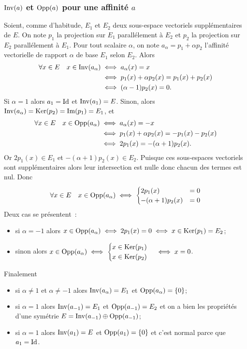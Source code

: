 \subsubsection{\(\operatorname{Inv}(a)\) et \(\operatorname{Opp}(a)\) pour une affinité \(a\)}

Soient, comme d'habitude, \(E_1\) et \(E_2\) deux sous-espace vectoriels supplémentaires de \(E\). On note \(p_1\) la projection sur \(E_1\) parallélement à \(E_2\) et \(p_2\) la projection sur \(E_2\) parallélement à \(E_1\). Pour tout scalaire \(\alpha\), on note \(a_\alpha = p_1+\alpha p_2\) l'affinité vectorielle de rapport \(\alpha\) de base \(E_1\) selon \(E_2\). Alors
\begin{align}
  \forall x \in E \quad x \in \operatorname{Inv}(a_\alpha) &\iff a_\alpha(x)=x \\
  &\iff p_1(x)+\alpha p_2(x) = p_1(x)+p_2(x) \\
  &\iff (\alpha-1) p_2(x)=0.
\end{align}
Si \(\alpha=1\) alors \(a_1=\operatorname{Id}\) et \(\operatorname{Inv}(a_1)=E\). Sinon, alors \(\operatorname{Inv}(a_\alpha)=\operatorname{Ker}(p_2)=\operatorname{Im}(p_1)=E_1\), et
\begin{align}
  \forall x \in E \quad x \in \operatorname{Opp}(a_\alpha) &\iff a_\alpha(x)=-x \\
  &\iff p_1(x)+\alpha p_2(x) = -p_1(x)-p_2(x) \\
  &\iff 2p_1(x)=-(\alpha+1)p_2(x).
\end{align}
Or \(2p_1(x) \in E_1\) et \(-(\alpha+1)p_2(x) \in E_2\). Puisque ces sous-espaces vectoriels sont supplémentaires alors leur intersection est nulle donc chacun des termes est nul. Donc
\begin{equation}
  \forall x \in E \quad x \in \operatorname{Opp}(a_\alpha) \iff \begin{cases} 2p_1(x) &=0 \\-(\alpha+1)p_2(x)&=0 \end{cases}
\end{equation}
Deux cas se présentent~:
\begin{itemize}
\item si \(\alpha=-1\) alors \(x \in \operatorname{Opp}(a_\alpha) \iff 2p_1(x)=0 \iff x \in \operatorname{Ker}(p_1)=E_2\);
\item sinon alors \(x \in \operatorname{Opp}(a_\alpha) \iff \begin{cases} x \in \operatorname{Ker}(p_1) \\ x \in \operatorname{Ker}(p_2) \end{cases} \iff x=0\).
\end{itemize}
Finalement
\begin{itemize}
\item si \(\alpha \neq 1\) et \(\alpha \neq -1\) alors \(\operatorname{Inv}(a_\alpha)=E_1\) et \(\operatorname{Opp}(a_\alpha)=\{0\}\);
\item si \(\alpha =1\) alors \(\operatorname{Inv}(a_{-1})=E_1\) et \(\operatorname{Opp}(a_{-1})=E_2\) et on a bien les propriétés d'une symétrie \(E=\operatorname{Inv}(a_{-1}) \oplus \operatorname{Opp}(a_{-1})\);
\item si \(\alpha=1\) alors  \(\operatorname{Inv}(a_{1})=E\) et \(\operatorname{Opp}(a_{1})=\{0\}\) et c'est normal parce que \(a_1=\operatorname{Id}\).
\end{itemize}

